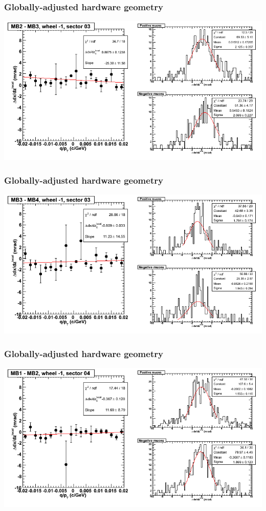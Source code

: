 \documentclass[compress]{beamer}
\begin{document}
\begin{frame}
\frametitle{Globally-adjusted hardware geometry}
\includegraphics[width=\linewidth]{NOV4_segdiffs_HW/dt13_slope_B_03_23.png}
\end{frame}

\begin{frame}
\frametitle{Globally-adjusted hardware geometry}
\includegraphics[width=\linewidth]{NOV4_segdiffs_HW/dt13_slope_B_03_34.png}
\end{frame}

\begin{frame}
\frametitle{Globally-adjusted hardware geometry}
\includegraphics[width=\linewidth]{NOV4_segdiffs_HW/dt13_slope_B_04_12.png}
\end{frame}
\end{document}
